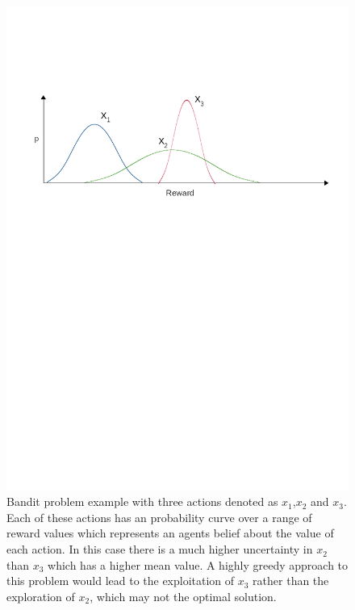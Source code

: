 \documentclass{article}
\begin{document}
	\begin{figure}[h]\label{fig:BPI}
	
		\centering 
		\includegraphics[trim= 100 650 100 200 ,scale=0.35]{BanditIntro.png}


		\caption{Bandit problem example with three actions denoted as \(x_1\),\(x_2\) and \(x_3\). Each of these actions has an probability curve over a range of reward values which represents an agents belief about the value of each action. In this case there is a much higher uncertainty in \(x_2\) than \(x_3\) which has a higher mean value. A highly greedy approach to this problem would lead to the exploitation of \(x_3\) rather than the exploration of \(x_2\), which may not the optimal solution.}



	\end{figure}
\end{document}
